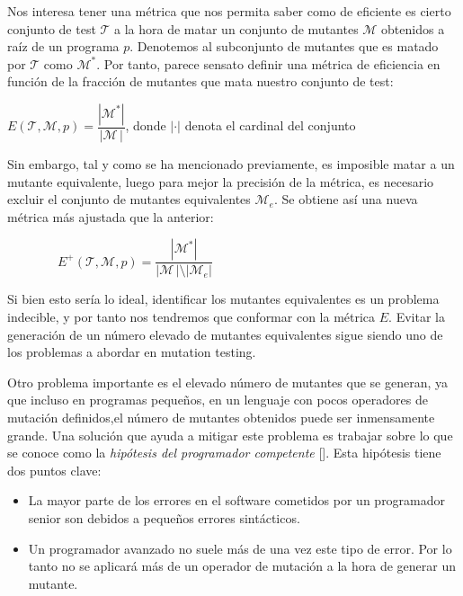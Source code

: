 Nos interesa tener una métrica que nos permita saber como de eficiente es cierto conjunto de test $\mathcal{T}$ a la hora de matar un conjunto de mutantes $\mathcal{M}$ obtenidos a raíz de un programa $p$. Denotemos al subconjunto de mutantes que es matado por $\mathcal{T}$ como $\mathcal{M}^*$. Por tanto, parece sensato definir una métrica de eficiencia en función de la fracción de mutantes que mata nuestro conjunto de test:
\begin{center}
$E(\mathcal{T},\mathcal{M},p) = \dfrac{|\mathcal{M}^*|}{|\mathcal{M} \,|}$, donde $|\cdot|$ denota el cardinal del conjunto
\end{center}

Sin embargo, tal y como se ha mencionado previamente, es imposible matar a un mutante equivalente, luego para mejor la precisión de la métrica, es necesario excluir el conjunto de mutantes equivalentes $\mathcal{M}_e$. Se obtiene así una nueva métrica más ajustada que la anterior:

$\hspace{48pt}E^+(\mathcal{T},\mathcal{M},p) = \dfrac{|\mathcal{M}^*|}{|\mathcal{M} \,|\setminus|\mathcal{M}_e|}$

Si bien esto sería lo ideal, identificar los mutantes equivalentes es un problema indecible, y por tanto nos tendremos que conformar con la métrica $E$. Evitar la generación de un número elevado de mutantes equivalentes sigue siendo uno de los problemas a abordar en mutation testing. 

Otro problema importante es el elevado número de mutantes que se generan, ya que incluso en programas pequeños, en un lenguaje con pocos operadores de mutación definidos,el número de mutantes obtenidos puede ser inmensamente grande. Una solución que ayuda a mitigar este problema es trabajar sobre lo que se conoce como la \textit{hipótesis del programador competente} [\cite{demillo1978hints}]. Esta hipótesis tiene dos puntos clave:
\begin{itemize}
\item La mayor parte de los errores en el software cometidos por un programador senior son debidos a pequeños errores sintácticos.
\item Un programador avanzado no suele más de una vez este tipo de error. Por lo tanto no se aplicará más de un operador de mutación a la hora de generar un mutante.
\end{itemize}

